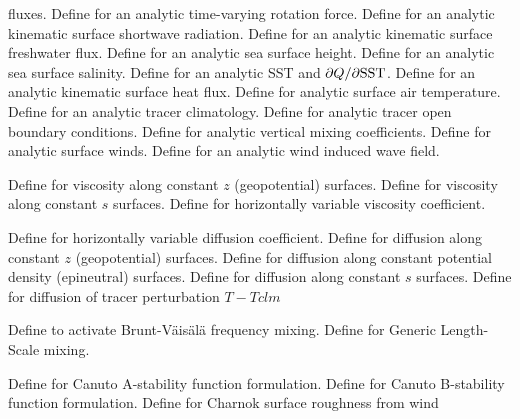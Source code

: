 \begin{klist}
\begin{klist}
  fluxes.
      Define for an analytic time-varying rotation
  force.
      Define for an analytic kinematic surface
  shortwave radiation.
      Define for an analytic kinematic surface
  freshwater flux.
      Define for an analytic sea surface height.
      Define for an analytic sea surface salinity.
      Define for an analytic SST and
  $\partial Q /\partial {\rm SST}$.
      Define for an analytic kinematic surface
  heat flux.
        Define for analytic surface air temperature.
      Define for an analytic tracer climatology.
       Define for analytic tracer open boundary
  conditions.
        Define for analytic vertical mixing
  coefficients.
       Define for analytic surface winds.
       Define for an analytic wind induced wave
  field.
  \end{klist}
   \mbox{}
  \begin{klist}
       Define for viscosity along constant $z$
   (geopotential) surfaces.
       Define for viscosity along constant $s$
   surfaces.
        Define for horizontally variable viscosity
     coefficient.
  \end{klist}
   \mbox{}
  \begin{klist}
        Define for horizontally variable diffusion
     coefficient.
       Define for diffusion along constant $z$
   (geopotential) surfaces.
       Define for diffusion along constant potential
   density (epineutral) surfaces.
       Define for diffusion along constant $s$
   surfaces.
       Define for diffusion of tracer perturbation
     $T-Tclm$
  \end{klist}
   \mbox{}
  \begin{klist}
       Define to activate Brunt-V\"ais\"al\"a
   frequency mixing.
       Define for Generic Length-Scale mixing.
    \begin{klist}
         Define for Canuto A-stability function
       formulation.
         Define for Canuto B-stability function
       formulation.
         Define for Charnok surface roughness from wind

\end{klist}
\end{klist}
\end{klist}
